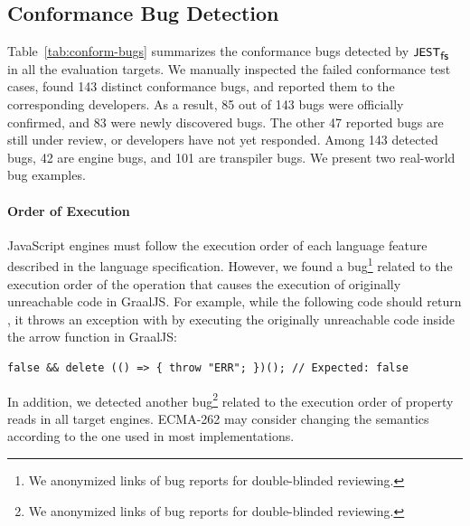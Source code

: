 \documentclass[acmsmall,review,screen]{acmart}
\newcommand{\name}[1]{\textsf{#1}}
\newcommand{\sname}[1]{\name{\small #1}}
\newcommand{\jest}{\sname{JEST}}
\newcommand{\tool}{\jest_{\sname{fs}}}
\newcommand{\jscode}[1]{\text{\lstinline[style=JS]!#1!}}
\begin{document}


\subsection{Conformance Bug Detection}\label{sec:conform-bug}


Table~\ref{tab:conform-bugs} summarizes the conformance bugs
detected by $\tool$ in all the evaluation targets.
We manually inspected the failed conformance test cases,
found 143 distinct conformance bugs, and reported them to
the corresponding developers.
%
As a result, 85 out of 143 bugs were officially confirmed, and
83 were newly discovered bugs.
%
The other 47 reported bugs are still under review, or developers have
not yet responded.
%
Among 143 detected bugs, 42 are engine bugs, and 101 are
transpiler bugs.
We present two real-world bug examples.


\paragraph{\textbf{Order of Execution}}
%
JavaScript engines must follow the execution order of each language feature
described in the language specification.
%
However, we found a bug\footnote{
  We anonymized links of bug reports for double-blinded reviewing.
} related to the execution order of the \jscode{delete} operation that causes
the execution of originally unreachable code in GraalJS.
%
For example, while the following code should return \jscode{false}, it throws an
exception with \jscode{"ERR"} by executing the originally unreachable code
inside the arrow function in GraalJS:
%
\begin{lstlisting}[style=JS, basicstyle=\footnotesize\ttfamily]
    false && delete (() => { throw "ERR"; })(); // Expected: false
\end{lstlisting}
%
In addition, we detected another bug\footnote{
  We anonymized links of bug reports for double-blinded reviewing.
} related to the execution order of property reads
%
%
%
in all target engines. ECMA-262 may consider changing the semantics
according to the one used in most implementations.
\end{document}
